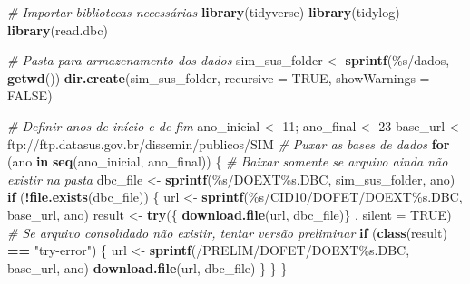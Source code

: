 \documentclass[
]{article}
\newenvironment{Shaded}{\begin{snugshade}}{\end{snugshade}}
\newcommand{\AttributeTok}[1]{\textcolor[rgb]{0.13,0.29,0.53}{#1}}
\newcommand{\CommentTok}[1]{\textcolor[rgb]{0.56,0.35,0.01}{\textit{#1}}}
\newcommand{\ConstantTok}[1]{\textcolor[rgb]{0.56,0.35,0.01}{#1}}
\newcommand{\ControlFlowTok}[1]{\textcolor[rgb]{0.13,0.29,0.53}{\textbf{#1}}}
\newcommand{\DecValTok}[1]{\textcolor[rgb]{0.00,0.00,0.81}{#1}}
\newcommand{\FunctionTok}[1]{\textcolor[rgb]{0.13,0.29,0.53}{\textbf{#1}}}
\newcommand{\NormalTok}[1]{#1}
\newcommand{\OtherTok}[1]{\textcolor[rgb]{0.56,0.35,0.01}{#1}}
\newcommand{\SpecialCharTok}[1]{\textcolor[rgb]{0.81,0.36,0.00}{\textbf{#1}}}
\newcommand{\StringTok}[1]{\textcolor[rgb]{0.31,0.60,0.02}{#1}}
\begin{document}
\begin{Shaded}
\begin{Highlighting}[]
\CommentTok{\# Importar bibliotecas necessárias}
\FunctionTok{library}\NormalTok{(}\StringTok{\textquotesingle{}tidyverse\textquotesingle{}}\NormalTok{)}
\FunctionTok{library}\NormalTok{(}\StringTok{\textquotesingle{}tidylog\textquotesingle{}}\NormalTok{)}
\FunctionTok{library}\NormalTok{(}\StringTok{\textquotesingle{}read.dbc\textquotesingle{}}\NormalTok{)}

\CommentTok{\# Pasta para armazenamento dos dados}
\NormalTok{sim\_sus\_folder }\OtherTok{\textless{}{-}} \FunctionTok{sprintf}\NormalTok{(}\StringTok{\textquotesingle{}\%s/dados\textquotesingle{}}\NormalTok{, }\FunctionTok{getwd}\NormalTok{())}
\FunctionTok{dir.create}\NormalTok{(sim\_sus\_folder, }\AttributeTok{recursive =} \ConstantTok{TRUE}\NormalTok{, }\AttributeTok{showWarnings =} \ConstantTok{FALSE}\NormalTok{)}

\CommentTok{\# Definir anos de início e de fim}
\NormalTok{ano\_inicial }\OtherTok{\textless{}{-}} \DecValTok{11}\NormalTok{; ano\_final }\OtherTok{\textless{}{-}} \DecValTok{23}
\NormalTok{base\_url }\OtherTok{\textless{}{-}} \StringTok{\textquotesingle{}ftp://ftp.datasus.gov.br/dissemin/publicos/SIM\textquotesingle{}}
\CommentTok{\# Puxar as bases de dados}
\ControlFlowTok{for}\NormalTok{ (ano }\ControlFlowTok{in} \FunctionTok{seq}\NormalTok{(ano\_inicial, ano\_final)) \{}
  \CommentTok{\# Baixar somente se arquivo ainda não existir na pasta}
\NormalTok{  dbc\_file }\OtherTok{\textless{}{-}} \FunctionTok{sprintf}\NormalTok{(}\StringTok{\textquotesingle{}\%s/DOEXT\%s.DBC\textquotesingle{}}\NormalTok{, sim\_sus\_folder, ano)}
  \ControlFlowTok{if}\NormalTok{ (}\SpecialCharTok{!}\FunctionTok{file.exists}\NormalTok{(dbc\_file)) \{}
\NormalTok{    url }\OtherTok{\textless{}{-}} \FunctionTok{sprintf}\NormalTok{(}\StringTok{\textquotesingle{}\%s/CID10/DOFET/DOEXT\%s.DBC\textquotesingle{}}\NormalTok{, base\_url, ano)}
\NormalTok{    result }\OtherTok{\textless{}{-}} \FunctionTok{try}\NormalTok{(\{ }\FunctionTok{download.file}\NormalTok{(url, dbc\_file)\} , }\AttributeTok{silent =} \ConstantTok{TRUE}\NormalTok{)}
    \CommentTok{\# Se arquivo consolidado não existir, tentar versão preliminar}
    \ControlFlowTok{if}\NormalTok{ (}\FunctionTok{class}\NormalTok{(result) }\SpecialCharTok{==} \StringTok{"try{-}error"}\NormalTok{) \{}
\NormalTok{      url }\OtherTok{\textless{}{-}} \FunctionTok{sprintf}\NormalTok{(}\StringTok{\textquotesingle{}/PRELIM/DOFET/DOEXT\%s.DBC\textquotesingle{}}\NormalTok{, base\_url, ano)}
      \FunctionTok{download.file}\NormalTok{(url, dbc\_file)}
\NormalTok{    \}}
\NormalTok{  \}}
\NormalTok{\}}
\end{Highlighting}
\end{Shaded}
\end{document}

